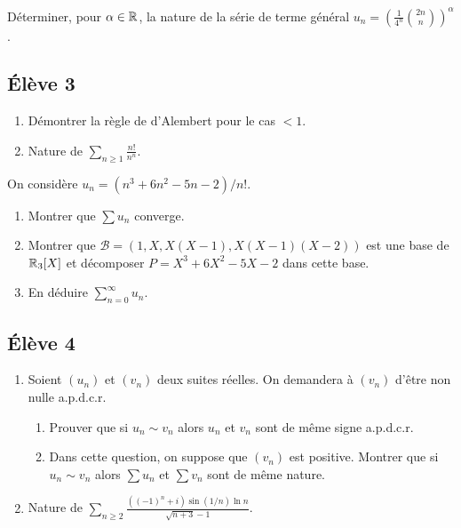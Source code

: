\documentclass[10pt]{scrartcl}
\begin{document}
    \begin{exo}
        Déterminer, pour $\alpha\in\operatorname{\mathbb R}$, la nature de la série de terme général $u_n=\left(\frac1{4^n}\binom{2n}n\right)^\alpha$.
    \end{exo}

    \subsection*{Élève 3}
    \begin{ccp}\hfill
        \begin{enumerate}
            \item Démontrer la règle de d'Alembert pour le cas $<1$.
            \item Nature de $\sum_{n\geq 1}\frac{n!}{n^n}$.
        \end{enumerate}
    \end{ccp}

    \begin{exo}
        On considère $u_n=(n^3+6n^2-5n-2)/n!$.
        \begin{enumerate}
            \item Montrer que $\sum u_n$ converge. 
            \item Montrer que $\mathcal B=(1,X,X(X-1),X(X-1)(X-2))$ est une base de $\operatorname{\mathbb R}_3[X]$ et décomposer $P=X^3+6X^2-5X-2$ dans cette base.
            \item En déduire $\sum_{n=0}^\infty u_n$.
        \end{enumerate}
    \end{exo}

    \subsection*{Élève 4}
    \begin{ccp}\hfill
        \begin{enumerate}
            \item Soient $(u_n)$ et $(v_n)$ deux suites réelles. On demandera à $(v_n)$ d'être non nulle a.p.d.c.r.
            \begin{enumerate}
                \item Prouver que si $u_n\sim v_n$ alors $u_n$ et $v_n$ sont de même signe a.p.d.c.r.
                \item Dans cette question, on suppose que $(v_n)$ est positive. 
                Montrer que si $u_n\sim v_n$ alors $\sum u_n$ et $\sum v_n$ sont de même nature.
            \end{enumerate}
            \item Nature de $\sum_{n\geq 2}\frac{((-1)^n+i)\sin(1/n)\ln n}{\sqrt{n+3}-1}$.
        \end{enumerate}
    \end{ccp}
\end{document}
